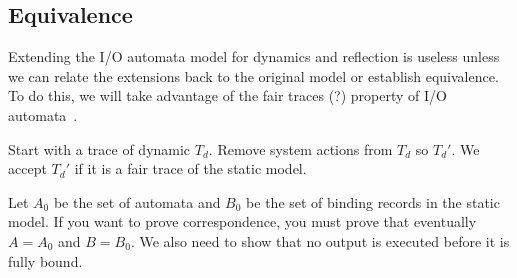 \subsection{Equivalence}

Extending the I/O automata model for dynamics and reflection is useless unless we can relate the extensions back to the original model or establish equivalence.
To do this, we will take advantage of the fair traces (?) property of I/O automata~\cite{distributed_algorithms}.


Start with a trace of dynamic $T_d$.
Remove system actions from $T_d$ so $T_d'$.
We accept $T_d'$ if it is a fair trace of the static model.

Let $A_0$ be the set of automata and $B_0$ be the set of binding records in the static model.
If you want to prove correspondence, you must prove that eventually $A = A_0$ and $B = B_0$.
We also need to show that no output is executed before it is fully bound.


